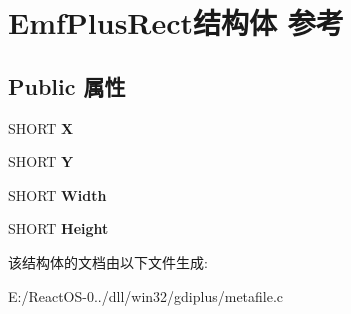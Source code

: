 \hypertarget{struct_emf_plus_rect}{}\section{Emf\+Plus\+Rect结构体 参考}
\label{struct_emf_plus_rect}
\subsection*{Public 属性}
\begin{DoxyCompactItemize}
\item 
\mbox{\label{struct_emf_plus_rect_a72ccadcd0dff586bc8313ac4ae252dcc}} 
S\+H\+O\+RT {\bfseries X}
\item 
\mbox{\label{struct_emf_plus_rect_a57102932ccb33206ba592e12a2d8f74a}} 
S\+H\+O\+RT {\bfseries Y}
\item 
\mbox{\label{struct_emf_plus_rect_abe5dd8a682f9fa451401f22dc94b7706}} 
S\+H\+O\+RT {\bfseries Width}
\item 
\mbox{\label{struct_emf_plus_rect_a7b80cc59e3a1af89587e6ba878b77e25}} 
S\+H\+O\+RT {\bfseries Height}
\end{DoxyCompactItemize}


该结构体的文档由以下文件生成\+:\begin{DoxyCompactItemize}
\item 
E\+:/\+React\+O\+S-\/0../dll/win32/gdiplus/metafile.\+c\end{DoxyCompactItemize}
